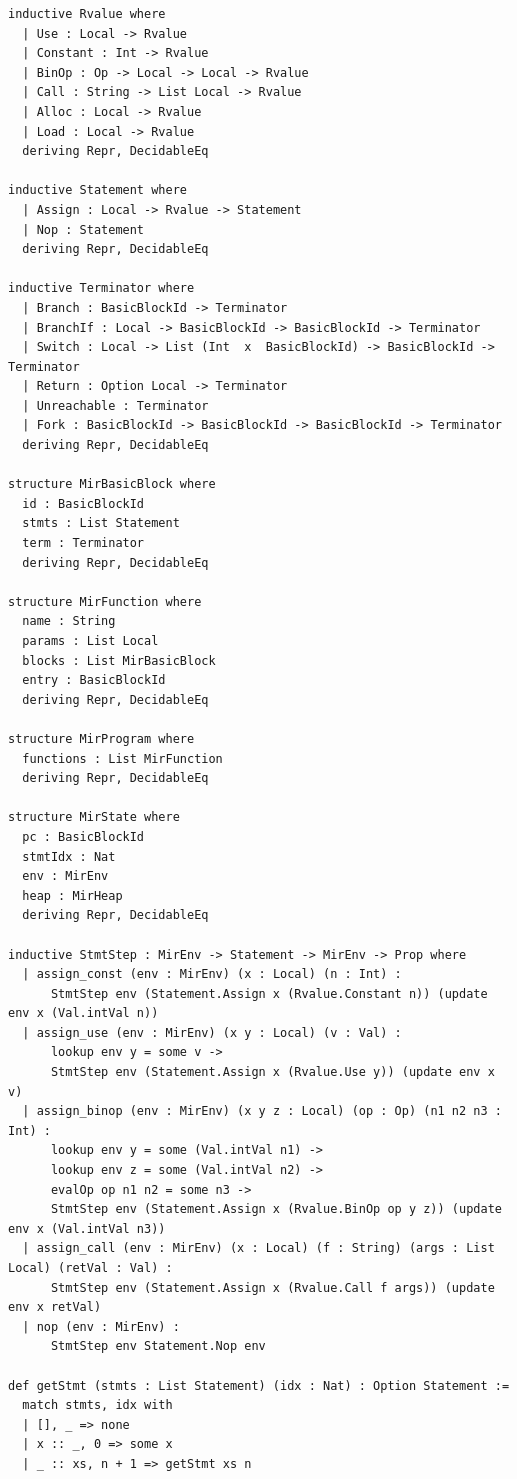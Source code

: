 \begin{lstlisting}[language=Lean4, caption={Complete Formal Operational Semantics Mechanization in Lean 4 (\texttt{lean/Supercompiler/Semantics.lean}).}, label={lst:semantics_lean_verbatim}]
inductive Rvalue where
  | Use : Local -> Rvalue
  | Constant : Int -> Rvalue
  | BinOp : Op -> Local -> Local -> Rvalue
  | Call : String -> List Local -> Rvalue
  | Alloc : Local -> Rvalue
  | Load : Local -> Rvalue
  deriving Repr, DecidableEq

inductive Statement where
  | Assign : Local -> Rvalue -> Statement
  | Nop : Statement
  deriving Repr, DecidableEq

inductive Terminator where
  | Branch : BasicBlockId -> Terminator
  | BranchIf : Local -> BasicBlockId -> BasicBlockId -> Terminator
  | Switch : Local -> List (Int  x  BasicBlockId) -> BasicBlockId -> Terminator
  | Return : Option Local -> Terminator
  | Unreachable : Terminator
  | Fork : BasicBlockId -> BasicBlockId -> BasicBlockId -> Terminator
  deriving Repr, DecidableEq

structure MirBasicBlock where
  id : BasicBlockId
  stmts : List Statement
  term : Terminator
  deriving Repr, DecidableEq

structure MirFunction where
  name : String
  params : List Local
  blocks : List MirBasicBlock
  entry : BasicBlockId
  deriving Repr, DecidableEq

structure MirProgram where
  functions : List MirFunction
  deriving Repr, DecidableEq

structure MirState where
  pc : BasicBlockId
  stmtIdx : Nat
  env : MirEnv
  heap : MirHeap
  deriving Repr, DecidableEq

inductive StmtStep : MirEnv -> Statement -> MirEnv -> Prop where
  | assign_const (env : MirEnv) (x : Local) (n : Int) :
      StmtStep env (Statement.Assign x (Rvalue.Constant n)) (update env x (Val.intVal n))
  | assign_use (env : MirEnv) (x y : Local) (v : Val) :
      lookup env y = some v ->
      StmtStep env (Statement.Assign x (Rvalue.Use y)) (update env x v)
  | assign_binop (env : MirEnv) (x y z : Local) (op : Op) (n1 n2 n3 : Int) :
      lookup env y = some (Val.intVal n1) ->
      lookup env z = some (Val.intVal n2) ->
      evalOp op n1 n2 = some n3 ->
      StmtStep env (Statement.Assign x (Rvalue.BinOp op y z)) (update env x (Val.intVal n3))
  | assign_call (env : MirEnv) (x : Local) (f : String) (args : List Local) (retVal : Val) :
      StmtStep env (Statement.Assign x (Rvalue.Call f args)) (update env x retVal)
  | nop (env : MirEnv) :
      StmtStep env Statement.Nop env

def getStmt (stmts : List Statement) (idx : Nat) : Option Statement :=
  match stmts, idx with
  | [], _ => none
  | x :: _, 0 => some x
  | _ :: xs, n + 1 => getStmt xs n


\end{lstlisting}
